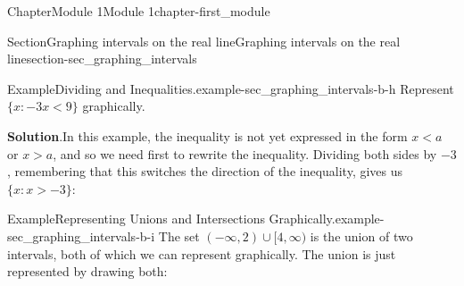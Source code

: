 \documentclass[oneside,10pt,]{book}
\newcommand{\blocktitlefont}{\relax}
\newcommand{\lt}{<}
\begin{document}
\begin{chapterptx}{Chapter}{Module 1}{}{Module 1}{}{}{chapter-first_module}
\begin{sectionptx}{Section}{Graphing intervals on the real line}{}{Graphing intervals on the real line}{}{}{section-sec_graphing_intervals}
\begin{introduction}{}
\begin{image}{0}{1}{0}{}
{
}%
\end{image}%
\begin{example}{Example}{Dividing and Inequalities.}{example-sec_graphing_intervals-b-h}%
Represent \(\{x: -3x \lt 9\}\) graphically.%
\par\smallskip%
\noindent\textbf{\blocktitlefont Solution}.\hypertarget{solution-sec_graphing_intervals-b-h-c}{}\quad{}In this example, the inequality is not yet expressed in the form \(x\lt a\) or \(x>a\), and so we need first to rewrite the inequality.  Dividing both sides by \(-3\), remembering that this switches the direction of the inequality, gives us \(\{x : x > -3\}\):%
\begin{image}{0}{1}{0}{}%
%
\end{image}%
\end{example}
\begin{example}{Example}{Representing Unions and Intersections Graphically.}{example-sec_graphing_intervals-b-i}%
The set \(( - \infty, 2 ) \cup \big[ 4, \infty )\) is the union of two intervals, both of which we can represent graphically.  The union is just represented by drawing both:%
\begin{image}{0}{1}{0}{}%

\end{image}
\end{example}
\end{introduction}
\end{sectionptx}
\end{chapterptx}
\end{document}
